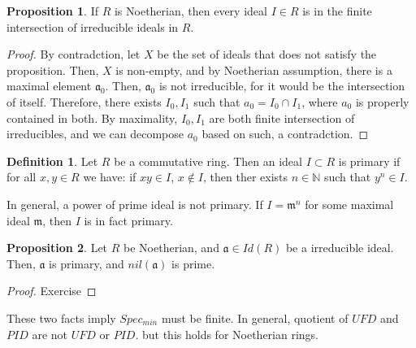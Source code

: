 \documentclass{article}
\theoremstyle{definition}
\theoremstyle{definition}
\theoremstyle{definition}
\newtheorem{proposition}{Proposition}[section]
\theoremstyle{definition}
\theoremstyle{definition}
\newtheorem{definition}{Definition}[section]
\theoremstyle{definition}
\theoremstyle{definition}
\begin{document}
\begin{tcolorbox}[colback=blue!5!white,colframe=blue!30!white]
\begin{proposition}
If $R$ is Noetherian, then every ideal $I\in R$ is in the finite intersection of irreducible ideals in $R$. 
\end{proposition}
\end{tcolorbox}
\begin{proof}
    By contradction, let $X$ be the set of ideals that does not satisfy the proposition. Then, $X$ is non-empty, and by Noetherian assumption, there is a maximal element $\mathfrak{a_0}$. Then, $\mathfrak{a_0}$ is not irreducible, for it would be the intersection of itself. Therefore, there exists $I_0,I_1$ such that $a_0=I_0\cap I_1$, where $a_0$ is properly contained in both. By maximality, $I_0,I_1$ are both finite intersection of irreducibles, and we can decompose $a_0$ based on such, a contradction.
\end{proof}


\begin{tcolorbox}[colback=purple!5!white,colframe=purple!75!black]
\begin{definition}
Let $R$ be a commutative ring. Then an ideal $I\subset R$ is primary if for all $x,y\in R$ we have: if $xy\in I$, $x\not \in I$, then ther exists $n\in \mathbb{N}$ such that $y^n\in I$.
\end{definition}
\end{tcolorbox}
In general, a power of prime ideal is not primary. If $I=\mathfrak{m}^n$ for some maximal ideal $\mathfrak{m}$, then $I$ is in fact primary. 


\begin{tcolorbox}[colback=blue!5!white,colframe=blue!30!white]
\begin{proposition}
Let $R$ be Noetherian, and $\mathfrak{a}\in Id(R)$ be a irreducible ideal. Then, $\mathfrak{a}$ is primary, and $nil(\mathfrak{a})$ is prime. 
\end{proposition}
\end{tcolorbox}
\begin{proof}
    Exercise
\end{proof}
These two facts imply $Spec_{min}$ must be finite. In general, quotient of $UFD$ and $PID$ are not $UFD$ or $PID$. but this holds for Noetherian rings. 
\end{document}
